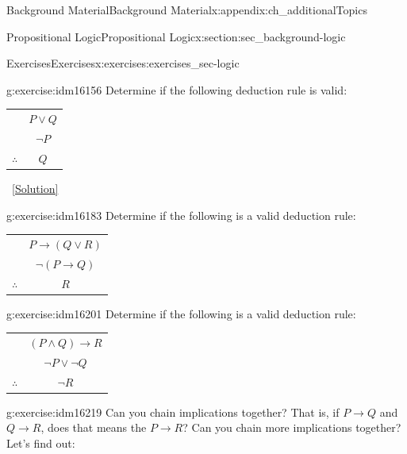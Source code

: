 \documentclass[oneside,10pt,]{book}
\numberwithin{equation}{chapter}
\newcommand{\hrulethin}  {\noalign{\hrule height 0.04em}}
\def\imp{\rightarrow}
\begin{document}
\begin{appendixptx}{Background Material}{}{Background Material}{}{}{x:appendix:ch_additionalTopics}
\begin{sectionptx}{Propositional Logic}{}{Propositional Logic}{}{}{x:section:sec_background-logic}
\begin{exercises-subsection}{Exercises}{}{Exercises}{}{}{x:exercises:exercises_sec-logic}
\begin{divisionexercise}{10}{}{}{g:exercise:idm16156}%
Determine if the following deduction rule is valid:%
\begin{sidebyside}{1}{0}{0}{0}%
\begin{sbspanel}{1}%
{\centering%
\begin{tabular}{cc}
&\(P \vee Q\)\tabularnewline[0pt]
&\(\neg P\)\tabularnewline\hrulethin
\(\therefore\)&\(Q\)
\end{tabular}
\par}
\end{sbspanel}%
\end{sidebyside}%
\qquad~\hfill{\tiny\hyperlink{g:solution:idm16174-main}{[Solution]}}\end{divisionexercise}%
\begin{divisionexercise}{11}{}{}{g:exercise:idm16183}%
Determine if the following is a valid deduction rule:%
\begin{sidebyside}{1}{0}{0}{0}%
\begin{sbspanel}{1}%
{\centering%
\begin{tabular}{cc}
&\(P \imp (Q \vee R)\)\tabularnewline[0pt]
&\(\neg(P \imp Q)\)\tabularnewline\hrulethin
\(\therefore\)&\(R\)
\end{tabular}
\par}
\end{sbspanel}%
\end{sidebyside}%
\end{divisionexercise}%
\begin{divisionexercise}{12}{}{}{g:exercise:idm16201}%
Determine if the following is a valid deduction rule:%
\begin{sidebyside}{1}{0}{0}{0}%
\begin{sbspanel}{1}%
{\centering%
\begin{tabular}{cc}
&\((P \wedge Q) \imp R\)\tabularnewline[0pt]
&\(\neg P \vee \neg Q\)\tabularnewline\hrulethin
\(\therefore\)&\(\neg R\)
\end{tabular}
\par}
\end{sbspanel}%
\end{sidebyside}%
\end{divisionexercise}%
\begin{divisionexercise}{13}{}{}{g:exercise:idm16219}%
Can you chain implications together? That is, if \(P \imp Q\) and \(Q \imp R\), does that means the \(P \imp R\)? Can you chain more implications together? Let's find out:%
\par

\end{divisionexercise}
\end{exercises-subsection}
\end{sectionptx}
\end{appendixptx}
\end{document}
